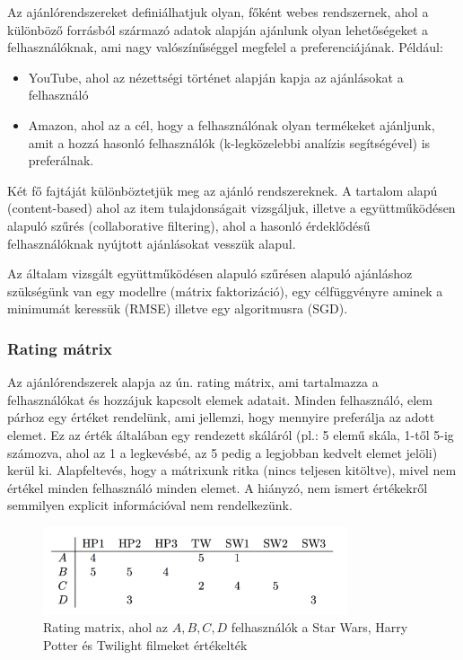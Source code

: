 \documentclass[a4paper,12pt]{article}
\begin{document}
Az ajánlórendszereket definiálhatjuk olyan, főként webes rendszernek, ahol a különböző forrásból származó adatok alapján ajánlunk olyan lehetőségeket a felhasználóknak, ami nagy valószínűséggel megfelel a preferenciájának. Például:
\begin{itemize}
\item YouTube, ahol az nézettségi történet alapján kapja az ajánlásokat a felhasználó
\item Amazon, ahol az a cél, hogy a felhasználónak olyan termékeket ajánljunk, amit a hozzá hasonló felhasználók (k-legközelebbi analízis segítségével) is preferálnak. \cite{knearest}
\end{itemize}
Két fő fajtáját különböztetjük meg az ajánló rendszereknek. A tartalom alapú (content-based) ahol az item tulajdonságait vizsgáljuk, illetve a együttműködésen alapuló szűrés (collaborative filtering), ahol a hasonló érdeklődésű felhasználóknak nyújtott ajánlásokat vesszük alapul. \newline

Az általam vizsgált együttműködésen alapuló szűrésen alapuló ajánláshoz szükségünk van egy modellre (mátrix faktorizáció), egy célfüggvényre aminek a minimumát keressük (RMSE) illetve egy algoritmusra (SGD).

\subsubsection{Rating mátrix}

Az ajánlórendszerek alapja az ún. rating mátrix, ami tartalmazza a felhasználókat és hozzájuk kapcsolt elemek adatait. Minden felhasználó, elem párhoz egy értéket rendelünk, ami jellemzi, hogy mennyire preferálja az adott elemet. Ez az érték általában egy rendezett skáláról (pl.: 5 elemű skála, 1-től 5-ig számozva, ahol az 1 a legkevésbé, az 5 pedig a legjobban kedvelt elemet jelöli) kerül ki. Alapfeltevés, hogy a mátrixunk ritka (nincs teljesen kitöltve), mivel nem értékel minden felhasználó minden elemet. A hiányzó, nem ismert értékekről semmilyen explicit információval nem rendelkezünk.

\begin{figure}[ht!]
\centering
\includegraphics[width=90mm]{img/um.png}
\caption{Rating matrix, ahol az $A,B, C, D$ felhasználók a Star Wars, Harry Potter és Twilight filmeket értékelték \cite{UlmannMatrix} \label{um}}
\end{figure}
\end{document}
